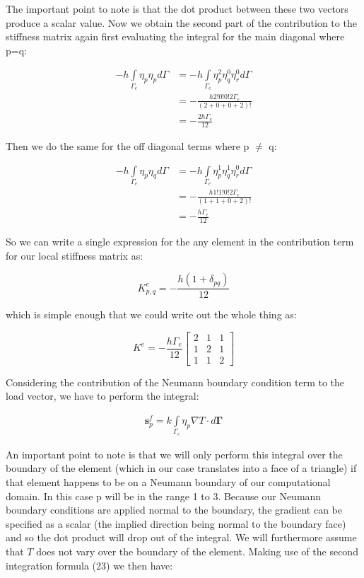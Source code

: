 \documentclass[12pt]{article}
\begin{document}
The important point to note is that the dot product between these two vectors
produce a scalar value. Now we obtain the second part of the contribution to the stiffness matrix again first evaluating the integral for the main diagonal where p=q:

\begin{align*}
 -h \int\limits_{\Gamma_e} \eta_p \eta_p d\Gamma & = 
 -h\int\limits_{\Gamma_e} \eta_p^2 \eta_q^0 \eta_r^0  d{\Gamma} \\
 & = -\frac{h 2!0!0!2\Gamma_e}{(2+0+0+2)!} \\
 & = -\frac{2h\Gamma_e}{12}
\end{align*}

Then we do the same for the off diagonal terms where p $\neq$ q:

\begin{align*}
 -h \int\limits_{\Gamma_e} \eta_p \eta_q d\Gamma & = 
 -h\int\limits_{\Gamma_e} \eta_p^1 \eta_q^1 \eta_r^0  d{\Gamma} \\
 & = -\frac{h 1!1!0!2\Gamma_e}{(1+1+0+2)!} \\
 & = -\frac{h\Gamma_e}{12}
\end{align*}

So we can write a single expression for the any element in the contribution term for our local stiffness matrix as:

$$
K_{p,q}^e =- \frac{h (1+\delta_{pq})}{12}
$$

which is simple enough that we could write out the whole thing as:

\begin{equation}
K^e = -\frac{h \Gamma_e}{12}{\begin{bmatrix} 2 & 1 & 1  \\ 1 & 2 & 1  \\ 1 & 1 & 2 \end{bmatrix}}
\end{equation}

Considering the contribution of the Neumann boundary condition term to
the load vector, we have to perform the integral:

\begin{align*}
 \mathbf{s}_p^f = k \int\limits_{\Gamma_{e}}{\eta_p\nabla T} \cdot d \mathbf{\Gamma}
\end{align*}

An important point to note is that we will only perform this integral over the boundary of the element (which in our case translates into a  face of a triangle) if that element happens to be on a Neumann boundary of our computational domain. In this case p will be in the range 1 to 3. Because our Neumann boundary conditions are applied normal to the boundary, the gradient can be specified as a scalar (the implied direction being normal to the boundary face) and so the dot product will drop out of the integral. We will furthermore assume that $T$ does not vary over the boundary of the element. Making use of the second integration formula (23) we then have:
\end{document}
